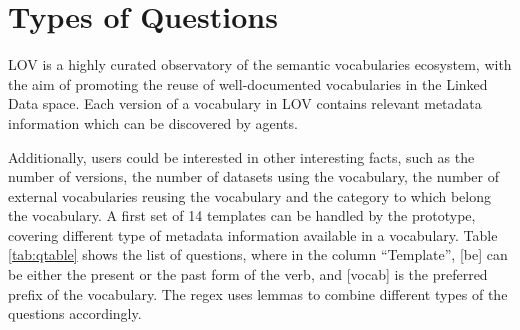 \documentclass[runningheads,a4paper]{llncs}
\newcommand{\todo}[1]{\noindent\textcolor{red}{{\bf \{TODO}: #1{\bf \}}}}
\begin{document}




\vspace{2mm}
\section{Types of Questions}
\label{sec:questions}

LOV is a highly curated observatory of the semantic vocabularies ecosystem, with the aim of promoting the reuse of well-documented vocabularies in the Linked Data space. Each version of a vocabulary in LOV contains relevant metadata information which can be discovered by agents. 

Additionally, users could be interested in other interesting facts, such as the number of versions, the number of datasets  using the vocabulary, the number of external vocabularies reusing the vocabulary and the category to which belong the vocabulary. A first set of 14 templates can be handled by the prototype, covering different type of metadata information available in a vocabulary. Table \ref{tab:qtable} shows the list of questions, where in the column ``Template'', [be] can be either the present or the past form of the verb, and [vocab] is the preferred prefix of the vocabulary. The regex uses lemmas to combine different types of the questions accordingly.
\end{document}
